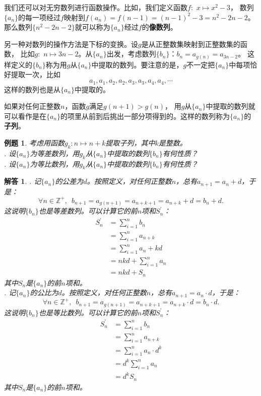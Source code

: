 \documentclass[12pt,UTF8]{ctexbook}
\newtheorem{et}{例题}[section]
\newtheorem*{so}{解答}
\begin{document}
我们还可以对无穷数列进行函数操作。比如，我们定义函数$f:\,\,x\mapsto x^2 - 3$，
数列$\{a_n\}$的每一项经过$f$映射到$f(a_n) = f(n-1) = (n-1)^2 - 3 = n^2 - 2n - 2$。
那么数列$\{n^2-2n-2\}$就可以称为$\{a_n\}$经过$f$的\textbf{像数列}。

另一种对数列的操作方法是下标的变换。设$g$是从正整数集映射到正整数集的函数，
比如$g:\,\, n \mapsto 3n - 2$。从$\{a_n\}$出发，考虑数列$\{b_n\}$：$b_n = a_{g(n)} = a_{3n-2}$。
这样定义的$\{b_n\}$称为用$g$从$\{a_n\}$中提取的数列。要注意的是，$g$不一定把$\{a_n\}$中每项恰好提取一次，比如
$$ a_1, a_1, a_2, a_2, a_3, a_3, a_4, a_4, \cdots $$
这样的数列也是从$\{a_n\}$中提取的。

如果对任何正整数$n$，函数$g$满足$g(n+1) > g(n)$，
用$g$从$\{a_n\}$中提取的数列就可以看作是在$\{a_n\}$的项里从前到后挑出一部分项得到的。这样的数列称为$\{a_n\}$的\textbf{子列}。

\begin{et}
    考虑用函数$g_k: n\mapsto n + k$提取子列，其中$k$是整数。\\
    . 设$\{a_n\}$为等差数列，用$g_k$从$\{a_n\}$中提取的数列$\{b_n\}$有何性质？\\
    . 设$\{a_n\}$为等比数列，用$g_k$从$\{a_n\}$中提取的数列$\{b_n\}$有何性质？
\end{et}
\begin{so}
    . 记$\{a_n\}$的公差为$d$。按照定义，对任何正整数$n$，总有$a_{n+1} = a_n + d$，于是：
    $$ \forall n\in \mathbb{Z}^+, \,\,\, b_{n+1} = a_{g(n+1)} = a_{n+k+1} = a_{n+k} + d = b_n + d.$$
    这说明$\{b_n\}$也是等差数列。可以计算它的前$n$项和$S_n^\prime$：
    \begin{align*}
        S_n^\prime &= \sum_{i=1}^n b_n  \\
            &= \sum_{i=1}^n a_{n+k}  \\
            &= \sum_{i=1}^n a_{n} + kd  \\
            &= nkd + \sum_{i=1}^n a_{n}  \\
            &= nkd + S_n 
    \end{align*}
    其中$S_n$是$\{a_n\}$的前$n$项和。\\
    . 记$\{a_n\}$的公比为$d$。按照定义，对任何正整数$n$，总有$a_{n+1} = a_n \cdot d$，于是：
    $$ \forall n\in \mathbb{Z}^+, \,\,\, b_{n+1} = a_{g(n+1)} = a_{n+k+1} = a_{n+k} \cdot d = b_n \cdot d.$$
    这说明$\{b_n\}$也是等比数列。可以计算它的前$n$项和$S_n^\prime$：
    \begin{align*}
        S_n^\prime &= \sum_{i=1}^n b_n  \\
            &= \sum_{i=1}^n a_{n+k}  \\
            &= \sum_{i=1}^n a_{n} \cdot d^k  \\
            &= d^k \sum_{i=1}^n a_{n}  \\
            &= d^k S_n 
    \end{align*}
    其中$S_n$是$\{a_n\}$的前$n$项和。\\
\end{so}
\end{document}
